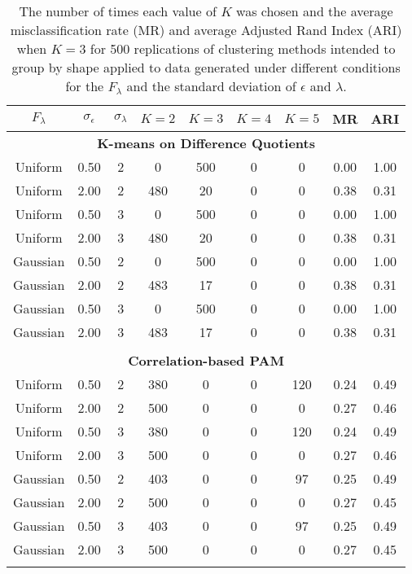 \begin{table}[ht]
\begin{center}
\begin{tabular}{ccc|cccccc}
  \thickhline $F_{\lambda}$&$\sigma_{\epsilon}$&$\sigma_{\lambda}$&$K=2$&$K=3$&$K=4$&$K=5$&MR&ARI\\  \hline\multicolumn{9}{c}{\textbf{K-means on Difference Quotients}}\\ Uniform & 0.50 &   2 &   0 & 500 &   0 &   0 & 0.00 & 1.00 \\ 
  Uniform & 2.00 &   2 & 480 &  20 &   0 &   0 & 0.38 & 0.31 \\ 
  Uniform & 0.50 &   3 &   0 & 500 &   0 &   0 & 0.00 & 1.00 \\ 
  Uniform & 2.00 &   3 & 480 &  20 &   0 &   0 & 0.38 & 0.31 \\ 
  Gaussian & 0.50 &   2 &   0 & 500 &   0 &   0 & 0.00 & 1.00 \\ 
  Gaussian & 2.00 &   2 & 483 &  17 &   0 &   0 & 0.38 & 0.31 \\ 
  Gaussian & 0.50 &   3 &   0 & 500 &   0 &   0 & 0.00 & 1.00 \\ 
  Gaussian & 2.00 &   3 & 483 &  17 &   0 &   0 & 0.38 & 0.31 \\ 
   \\ \multicolumn{9}{c}{\textbf{Correlation-based PAM}}\\Uniform & 0.50 &   2 & 380 &   0 &   0 & 120 & 0.24 & 0.49 \\ 
  Uniform & 2.00 &   2 & 500 &   0 &   0 &   0 & 0.27 & 0.46 \\ 
  Uniform & 0.50 &   3 & 380 &   0 &   0 & 120 & 0.24 & 0.49 \\ 
  Uniform & 2.00 &   3 & 500 &   0 &   0 &   0 & 0.27 & 0.46 \\ 
  Gaussian & 0.50 &   2 & 403 &   0 &   0 &  97 & 0.25 & 0.49 \\ 
  Gaussian & 2.00 &   2 & 500 &   0 &   0 &   0 & 0.27 & 0.45 \\ 
  Gaussian & 0.50 &   3 & 403 &   0 &   0 &  97 & 0.25 & 0.49 \\ 
  Gaussian & 2.00 &   3 & 500 &   0 &   0 &   0 & 0.27 & 0.45 \\ 
   \thickhline\end{tabular}
\caption{The number of times each value of $K$ was chosen and the average misclassification rate (MR) and average Adjusted Rand Index (ARI) when $K=3$ for 500 replications of clustering methods intended to group by shape applied to data generated under different conditions for the $F_{\lambda}$ and the standard deviation of $\epsilon$ and $\lambda$.}
\label{tab:freq2}
\end{center}
\end{table}

